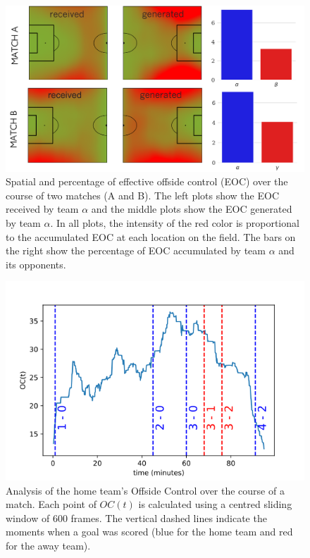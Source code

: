 \documentclass[
  10pt,
  twoside,nohyper]{book}
\begin{document}
\begin{figure}[H]

{\centering \includegraphics[width=0.8\linewidth,]{imagenes/Games_OC} 

}

\caption{Spatial and percentage of effective offside control (EOC) over the course of two matches (A and B). The left plots show the EOC received by team $\alpha$ and the middle plots show the EOC generated by team $\alpha$. In all plots, the intensity of the red color is proportional to the accumulated EOC at each location on the field. The bars on the right show the percentage of EOC accumulated by team $\alpha$ and its opponents.}\label{fig:games}
\end{figure}

\begin{figure}[H]

{\centering \includegraphics[width=0.8\linewidth,]{imagenes/cumulative_OC_evolution} 

}

\caption{Analysis of the home team's Offside Control over the course of a match. Each point of $OC(t)$ is calculated using a centred sliding window of 600 frames. The vertical dashed lines indicate the moments when a goal was scored (blue for the home team and red for the away team).}\label{fig:oct}
\end{figure}
\end{document}
